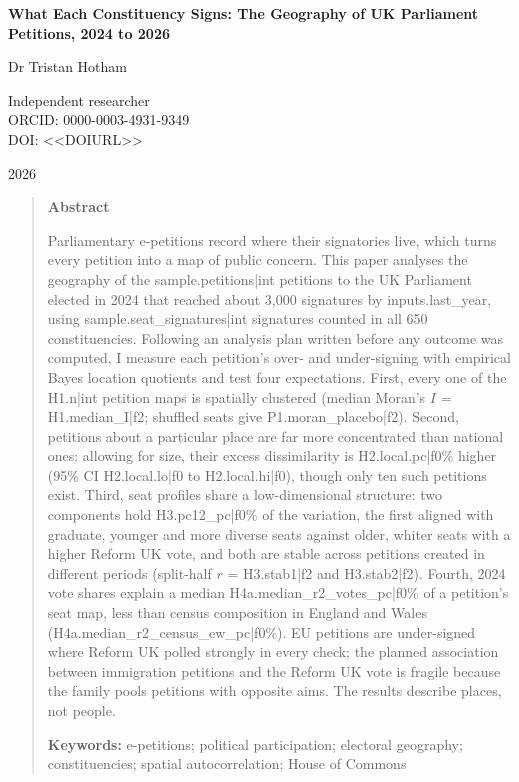\documentclass[11pt,a4paper]{article}
\begin{document}
\begin{center}
{\Large\bfseries What Each Constituency Signs: The Geography of UK Parliament Petitions, 2024 to 2026\par}
\vspace{1.2em}
{\large Dr Tristan Hotham\par}
\vspace{0.3em}
{\small Independent researcher\\
ORCID: 0000-0003-4931-9349\\
DOI: <<DOIURL>>\par}
\vspace{0.8em}
2026
\end{center}

\begin{quote}
\small
\begin{center}\textbf{Abstract}\end{center}
Parliamentary e-petitions record where their signatories live, which turns every petition into a map of public concern. This paper analyses the geography of the {{sample.petitions|int}} petitions to the UK Parliament elected in 2024 that reached about 3,000 signatures by {{inputs.last_year}}, using {{sample.seat_signatures|int}} signatures counted in all 650 constituencies. Following an analysis plan written before any outcome was computed, I measure each petition's over- and under-signing with empirical Bayes location quotients and test four expectations. First, every one of the {{H1.n|int}} petition maps is spatially clustered (median Moran's $I$ = {{H1.median_I|f2}}; shuffled seats give {{P1.moran_placebo|f2}}). Second, petitions about a particular place are far more concentrated than national ones: allowing for size, their excess dissimilarity is {{H2.local.pc|f0}}\% higher (95\% CI {{H2.local.lo|f0}} to {{H2.local.hi|f0}}), though only ten such petitions exist. Third, seat profiles share a low-dimensional structure: two components hold {{H3.pc12_pc|f0}}\% of the variation, the first aligned with graduate, younger and more diverse seats against older, whiter seats with a higher Reform UK vote, and both are stable across petitions created in different periods (split-half $r$ = {{H3.stab1|f2}} and {{H3.stab2|f2}}). Fourth, 2024 vote shares explain a median {{H4a.median_r2_votes_pc|f0}}\% of a petition's seat map, less than census composition in England and Wales ({{H4a.median_r2_census_ew_pc|f0}}\%). EU petitions are under-signed where Reform UK polled strongly in every check; the planned association between immigration petitions and the Reform UK vote is fragile because the family pools petitions with opposite aims. The results describe places, not people.

\textbf{Keywords:} e-petitions; political participation; electoral geography; constituencies; spatial autocorrelation; House of Commons
\end{quote}
\end{document}
